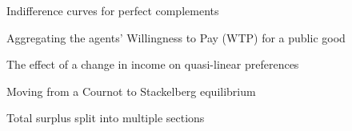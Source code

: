 \documentclass{article}
\begin{document}
\begin{figure}[H]
    \centering
    
    \caption{Indifference curves for perfect complements}
    \label{fig:20}
\end{figure}
\begin{figure}[H]
    \centering
    
    \caption{Aggregating the agents' Willingness to Pay (WTP) for a public good}
    \label{fig:21}
\end{figure}
\begin{figure}[H]
    \centering
    
    \caption{The effect of a change in income on quasi-linear preferences}
    \label{fig:22}
\end{figure}
\begin{figure}[H]
    \centering
    
    \caption{Moving from a Cournot to Stackelberg equilibrium}
    \label{fig:23}
\end{figure}
\begin{figure}[H]
    \centering
    
    \caption{Total surplus split into multiple sections}
    \label{fig:24}
\end{figure}
\end{document}
